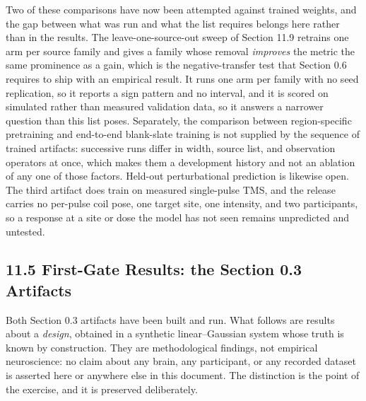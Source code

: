 Two of these comparisons have now been attempted against trained weights, and
the gap between what was run and what the list requires belongs here rather than
in the results. The leave-one-source-out sweep of Section 11.9 retrains one arm
per source family and gives a family whose removal \emph{improves} the metric the
same prominence as a gain, which is the negative-transfer test that Section 0.6
requires to ship with an empirical result. It runs one arm per family with no
seed replication, so it reports a sign pattern and no interval, and it is scored
on simulated rather than measured validation data, so it answers a narrower
question than this list poses. Separately, the comparison between region-specific
pretraining and end-to-end blank-slate training is not supplied by the sequence
of trained artifacts: successive runs differ in width, source list, and
observation operators at once, which makes them a development history and not an
ablation of any one of those factors. Held-out perturbational prediction is
likewise open. The third artifact does train on measured single-pulse TMS, and
the release carries no per-pulse coil pose, one target site, one intensity, and
two participants, so a response at a site or dose the model has not seen remains
unpredicted and untested.

\subsection{11.5 First-Gate Results: the Section 0.3 Artifacts}

Both Section 0.3 artifacts have been built and run. What follows are results
about a \emph{design}, obtained in a synthetic linear--Gaussian system whose
truth is known by construction. They are methodological findings, not empirical
neuroscience: no claim about any brain, any participant, or any recorded
dataset is asserted here or anywhere else in this document. The distinction is
the point of the exercise, and it is preserved deliberately.

